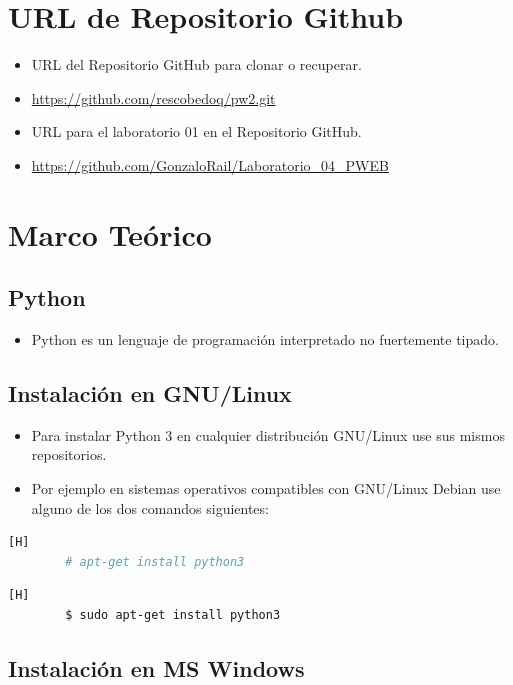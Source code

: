 \documentclass{article}
\begin{document}
	\section{URL de Repositorio Github}
	\begin{itemize}
		\item URL del Repositorio GitHub para clonar o recuperar.
		\item \url{https://github.com/rescobedoq/pw2.git}
		\item URL para el laboratorio 01 en el Repositorio GitHub.
		\item \url{https://github.com/GonzaloRail/Laboratorio_04_PWEB}
	\end{itemize}
	
	\section{Marco Teórico}
	
	\subsection{Python}
	\begin{itemize}	
		\item Python es un lenguaje de programación interpretado no fuertemente tipado.
		
	\end{itemize}	
	\subsection{Instalación en GNU/Linux}
	\begin{itemize}	
		\item Para instalar Python 3 en cualquier distribución GNU/Linux use sus mismos repositorios.
		\item Por ejemplo en sistemas operativos compatibles con GNU/Linux Debian use alguno de los dos comandos siguientes:
	\end{itemize}	
	\begin{lstlisting}[language=bash,caption={Instalar Python en GNU/Linux Debian}][H]
		# apt-get install python3
	\end{lstlisting}
	\begin{lstlisting}[language=bash,caption={Instalar Python en GNU/Linux Ubuntu}][H]
		$ sudo apt-get install python3
	\end{lstlisting}	
	
	
	\subsection{Instalación en MS Windows}
	
\end{document}
